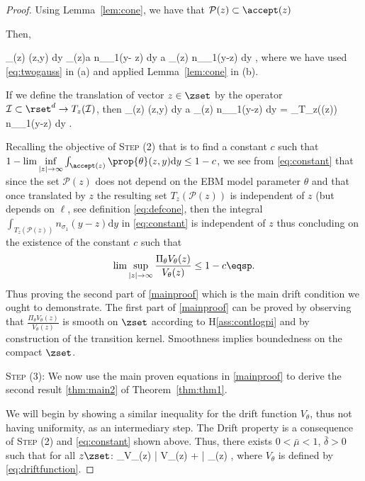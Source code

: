 \documentclass[10pt,twocolumn,letterpaper]{article}
\begin{document}
\begin{proof}
Using Lemma~\ref{lem:cone}, we have that $\mathcal{P}(z) \subset \accept(z)$

Then,  

\beq 
 \int_{\accept(z)} \prop{\theta}(z,y)  \textrm{d}y   \int_{\accept(z)}a n_{\sigma_1}(y- z)  \textrm{d}y  a \int_{(z)}  n_{\sigma_1}(y-z)  \textrm{d}y \eqsp,
 \eeq
where we have used \eqref{eq:twogauss} in (a) and applied Lemma~\ref{lem:cone} in (b).

If we define the translation of vector $z \in \zset$ by the operator $\mathcal{I} \subset \rset^d \to T_z(\mathcal{I})$, then
\beq\label{eq:constant}
 \int_{\accept(z)} \prop{\theta}(z,y)  \textrm{d}y \geq a \int_{(z)}  n_{\sigma_1}(y-z)  \textrm{d}y =  \int_{T_z((z))}  n_{\sigma_1}(y-z)  \textrm{d}y \eqsp.
\eeq


Recalling the objective of \noindent \textsc{Step (2)} that is to find a constant $c$ such that $1 - \lim \inf \limits_{|z| \to \infty}  \int_{\accept(z)} \prop{\theta}(z,y)  \textrm{d}y \leq 1 - c$, we see from \eqref{eq:constant} that since the set $\mathcal{P}(z)$ does not depend on the EBM model parameter $\theta$ and that once translated by $z$ the resulting set $T_z(\mathcal{P}(z))$ is independent of $z$ (but depends on $\ell$, see definition \eqref{eq:defcone}, then the integral $ \int_{T_z(\mathcal{P}(z))}  n_{\sigma_1}(y-z)  \textrm{d}y$ in \eqref{eq:constant} is independent of $z$ thus concluding on the existence of the constant $c$ such that 
$$\lim \sup \limits_{|z| \to \infty}  \frac{\Pi_\theta V_\theta(z)}{V_\theta(z)} \leq 1- c \eqsp.$$ 
Thus proving the second part of \eqref{mainproof} which is the main drift condition we ought to demonstrate.
The first part of \eqref{mainproof} can be proved by observing that $  \frac{\Pi_\theta V_\theta(z)}{V_\theta(z)} $ is smooth on $\zset$ according to H\ref{ass:contlogpi} and by construction of the transition kernel. Smoothness implies boundedness on the compact $\zset$.


\medskip
\noindent \textsc{Step (3): } 
We now use the main proven equations in \eqref{mainproof} to derive the second result \eqref{thm:main2} of Theorem~\ref{thm:thm1}.

We will begin by showing a similar inequality for the drift function $V_\theta$, thus not having uniformity, as an intermediary step.
The Drift property is a consequence of \textsc{Step (2)} and \eqref{eq:constant} shown above.
Thus, there exists $0 < \bar{\mu} < 1$, $\bar{\delta} > 0$ such that for all $z \zset$:
\beq\label{eq:driftvtheta}
\Pi_\theta V_\theta(z) \leq \bar{\mu} V_\theta(z) + \bar{\delta} _{}(z) \eqsp,
\eeq
where $V_\theta$ is defined by \eqref{eq:driftfunction}.


\end{proof}
\end{document}
